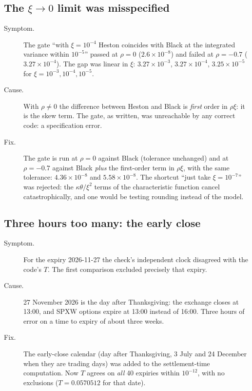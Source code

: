 \subsection{\texorpdfstring{The $\xi\to0$ limit was misspecified}{The xi -> 0 limit was misspecified}}
\begin{description}
\item[Symptom.] The gate ``with $\xi=10^{-4}$ Heston coincides with Black at the integrated variance within $10^{-5}$''
passed at $\rho=0$ ($2.6\times10^{-8}$) and failed at $\rho=-0.7$ ($3.27\times10^{-4}$). The gap was linear in $\xi$:
$3.27\times10^{-3}$, $3.27\times10^{-4}$, $3.25\times10^{-5}$ for $\xi=10^{-3},10^{-4},10^{-5}$.
\item[Cause.] With $\rho\ne0$ the difference between Heston and Black is \emph{first} order in $\rho\xi$: it is the
skew term. The gate, as written, was unreachable by any correct code: a specification error.
\item[Fix.] The gate is run at $\rho=0$ against Black (tolerance unchanged) and at $\rho=-0.7$ against Black
\emph{plus} the first-order term in $\rho\xi$, with the same tolerance: $4.36\times10^{-8}$ and $5.58\times10^{-8}$.
The shortcut ``just take $\xi=10^{-7}$'' was rejected: the $\kappa\theta/\xi^2$ terms of the characteristic function
cancel catastrophically, and one would be testing rounding instead of the model.
\end{description}

\subsection{Three hours too many: the early close}
\begin{description}
\item[Symptom.] For the expiry \mbox{2026-11-27} the check's independent clock disagreed with the code's $T$. The
first comparison excluded precisely that expiry.
\item[Cause.] 27 November 2026 is the day after Thanksgiving: the exchange closes at 13:00, and SPXW options expire at
13:00 instead of 16:00. Three hours of error on a time to expiry of about three weeks.
\item[Fix.] The early-close calendar (day after Thanksgiving, 3 July and 24 December when they are trading days) was
added to the settlement-time computation. Now $T$ agrees on \emph{all} 40 expiries within $10^{-12}$, with no
exclusions ($T=0.0570512$ for that date).
\end{description}

